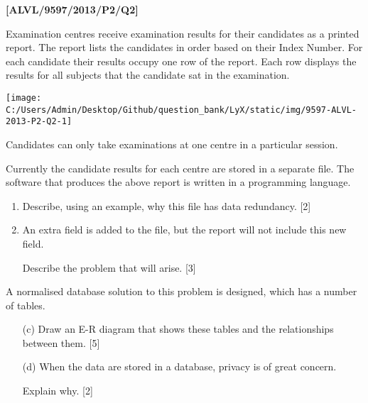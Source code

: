 \item \textbf{{[}ALVL/9597/2013/P2/Q2{]} }

Examination centres receive examination results for their candidates
as a printed report. The report lists the candidates in order based
on their Index Number. For each candidate their results occupy one
row of the report. Each row displays the results for all subjects
that the candidate sat in the examination.
\begin{center}
\texttt{[image: C:/Users/Admin/Desktop/Github/question\_bank/LyX/static/img/9597-ALVL-2013-P2-Q2-1]}
\par\end{center}

Candidates can only take examinations at one centre in a particular
session.

Currently the candidate results for each centre are stored in a separate
file. The software that produces the above report is written in a
programming language.
\begin{enumerate}
\item Describe, using an example, why this file has data redundancy.\hfill{}
{[}2{]}
\item An extra field is added to the file, but the report will not include
this new field. 

Describe the problem that will arise. \hfill{}{[}3{]}
\end{enumerate}
A normalised database solution to this problem is designed, which
has a number of tables.
\begin{enumerate}
\item[(c)]  Draw an E-R diagram that shows these tables and the relationships
between them.\hfill{} {[}5{]}
\item[(d)]  When the data are stored in a database, privacy is of great concern.

Explain why.\hfill{} {[}2{]}
\end{enumerate}
